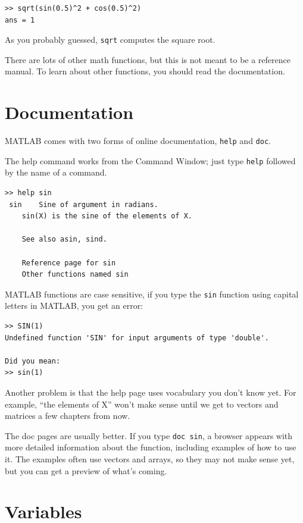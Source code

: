 \documentclass[
]{book}
\begin{document}
\begin{verbatim}
>> sqrt(sin(0.5)^2 + cos(0.5)^2)
ans = 1
\end{verbatim}

As you probably guessed, {\tt sqrt} computes the square root.

There are lots of other math functions, but this is not meant to
be a reference manual.  To learn about other functions, you should
read the documentation.


\section{Documentation}

MATLAB comes with two forms of online documentation, {\tt help}
and {\tt doc}.

The help command works from the Command Window; just type {\tt help}
followed by the name of a command.

\begin{verbatim}
>> help sin
 sin    Sine of argument in radians.
    sin(X) is the sine of the elements of X.

    See also asin, sind.

    Reference page for sin
    Other functions named sin
\end{verbatim}

MATLAB functions are case sensitive, if you type the {\tt sin} function using capital letters
in MATLAB, you get an error:

\begin{verbatim}
>> SIN(1)
Undefined function 'SIN' for input arguments of type 'double'.

Did you mean:
>> sin(1)
\end{verbatim}

Another problem is that the help page uses vocabulary you don't
know yet.  For example, ``the elements of X'' won't make sense until
we get to vectors and matrices a few chapters from now.

The doc pages are usually better.  If you type {\tt doc sin}, a
browser appears with more detailed information about the
function, including examples of how to use it.  The examples often
use vectors and arrays, so they may not make sense yet, but you can
get a preview of what's coming.


\section{Variables}
\end{document}
